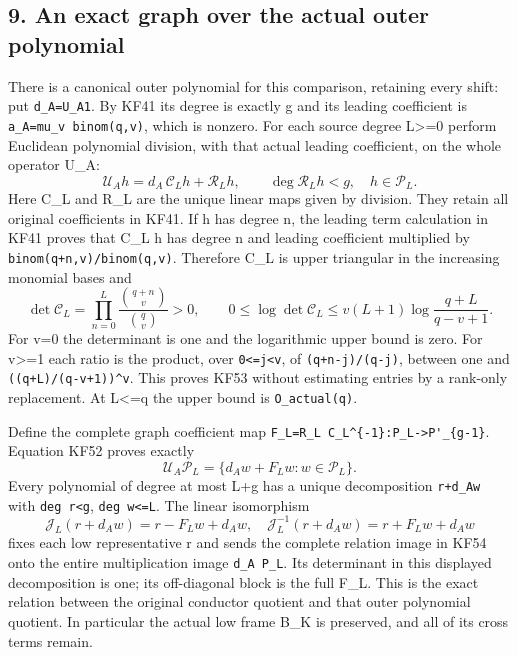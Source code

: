 \documentclass[11pt]{article}
\begin{document}
\subsection{9. An exact graph over the actual outer polynomial}\label{an-exact-graph-over-the-actual-outer-polynomial}

There is a canonical outer polynomial for this comparison, retaining every shift: put \texttt{d\_A=U\_A1}. By KF41 its degree is exactly g and its leading coefficient is \nolinkurl{a_A=mu_v binom(q,v)}, which is nonzero. For each source degree L\textgreater=0 perform Euclidean polynomial division, with that actual leading coefficient, on the whole operator U\_A: \[
\mathcal U_Ah=d_A\,\mathcal C_Lh+\mathcal R_Lh,
\qquad \deg\mathcal R_Lh<g,\quad h\in\mathcal P_L.
\tag{KF52}
\] Here C\_L and R\_L are the unique linear maps given by division. They retain all original coefficients in KF41. If h has degree n, the leading term calculation in KF41 proves that C\_L h has degree n and leading coefficient multiplied by \nolinkurl{binom(q+n,v)/binom(q,v)}. Therefore C\_L is upper triangular in the increasing monomial bases and \[
\det\mathcal C_L=
\prod_{n=0}^L\frac{\binom{q+n}{v}}{\binom qv}>0,
\qquad
0\le\log\det\mathcal C_L
\le v(L+1)\log\frac{q+L}{q-v+1}.
\tag{KF53}
\] For v=0 the determinant is one and the logarithmic upper bound is zero. For v\textgreater=1 each ratio is the product, over \texttt{0\textless{}=j\textless{}v}, of \texttt{(q+n-j)/(q-j)}, between one and \nolinkurl{((q+L)/(q-v+1))^v}. This proves KF53 without estimating entries by a rank-only replacement. At L\textless=q the upper bound is \texttt{O\_actual(q)}.

Define the complete graph coefficient map \nolinkurl{F_L=R_L C_L^{-1}:P_L->P'_{g-1}}. Equation KF52 proves exactly \[
\mathcal U_A\mathcal P_L
=\{d_Aw+F_Lw:w\in\mathcal P_L\}.
\tag{KF54}
\] Every polynomial of degree at most L+g has a unique decomposition \texttt{r+d\_Aw} with \texttt{deg\ r\textless{}g}, \texttt{deg\ w\textless{}=L}. The linear isomorphism \[
\mathcal J_L(r+d_Aw)=r-F_Lw+d_Aw,
\quad
\mathcal J_L^{-1}(r+d_Aw)=r+F_Lw+d_Aw
\tag{KF55}
\] fixes each low representative r and sends the complete relation image in KF54 onto the entire multiplication image \texttt{d\_A\ P\_L}. Its determinant in this displayed decomposition is one; its off-diagonal block is the full F\_L. This is the exact relation between the original conductor quotient and that outer polynomial quotient. In particular the actual low frame B\_K is preserved, and all of its cross terms remain.
\end{document}
